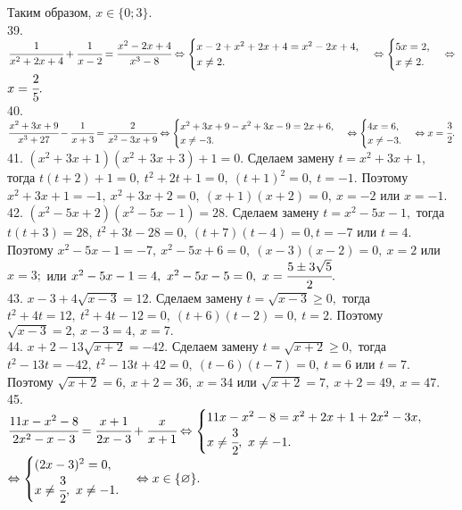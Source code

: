 Таким образом, $x\in\{0; 3\}.$\\
39. $\cfrac{1}{x^2+2x+4}+\cfrac{1}{x-2}=\cfrac{x^2-2x+4}{x^3-8}\Leftrightarrow \begin{cases}x-2+x^2+2x+4=x^2-2x+4,\\ x\neq2.\end{cases}
\Leftrightarrow \begin{cases}5x=2,\\ x\neq2.\end{cases}\Leftrightarrow$\\$ x=\cfrac{2}{5}.$\\
40. $\cfrac{x^2+3x+9}{x^3+27}-\cfrac{1}{x+3}=\cfrac{2}{x^2-3x+9}\Leftrightarrow \begin{cases}x^2+3x+9-x^2+3x-9=2x+6,\\ x\neq-3.\end{cases}
\Leftrightarrow\begin{cases} 4x=6,\\ x\neq-3.\end{cases}\Leftrightarrow x=\cfrac{3}{2}.$\\
41. $(x^2+3x+1)(x^2+3x+3)+1=0.$ Сделаем замену $t=x^2+3x+1,$ тогда $t(t+2)+1=0,\ t^2+2t+1=0,\ (t+1)^2=0,\ t=-1.$ Поэтому $x^2+3x+1=-1,\
x^2+3x+2=0,\ (x+1)(x+2)=0,\ x=-2$ или $x=-1.$\\
42. $(x^2-5x+2)(x^2-5x-1)=28.$ Сделаем замену $t=x^2-5x-1,$ тогда $t(t+3)=28,\ t^2+3t-28=0,\ (t+7)(t-4)=0, t=-7$ или $t=4.$ Поэтому $x^2-5x-1=-7,\ x^2-5x+6=0,\
(x-3)(x-2)=0,\ x=2$ или $x=3;$ или $x^2-5x-1=4,\ x^2-5x-5=0,\ x=\cfrac{5\pm3\sqrt{5}}{2}.$\\
43. $x-3+4\sqrt{x-3}=12.$ Сделаем замену $t=\sqrt{x-3}\geqslant0,$ тогда $t^2+4t=12,\ t^2+4t-12=0,\ (t+6)(t-2)=0,\ t=2.$ Поэтому $\sqrt{x-3}=2,\ x-3=4,\ x=7.$\\
44. $x+2-13\sqrt{x+2}=-42.$ Сделаем замену $t=\sqrt{x+2}\geqslant0,$ тогда $t^2-13t=-42,\ t^2-13t+42=0,\ (t-6)(t-7)=0,\ t=6$ или $t=7.$ Поэтому $\sqrt{x+2}=6,\ x+2=36,\ x=34$ или $\sqrt{x+2}=7,\ x+2=49,\ x=47.$\\
45. $\cfrac{11x-x^2-8}{2x^2-x-3}=\cfrac{x+1}{2x-3}+\cfrac{x}{x+1}\Leftrightarrow \begin{cases} 11x-x^2-8=x^2+2x+1+2x^2-3x,\\ x\neq\cfrac{3}{2},\ x\neq-1.\end{cases}$\\$
\Leftrightarrow \begin{cases} (2x-3)^2=0,\\ x\neq\cfrac{3}{2},\ x\neq-1.\end{cases}\Leftrightarrow x\in\{\varnothing\}.$\\
